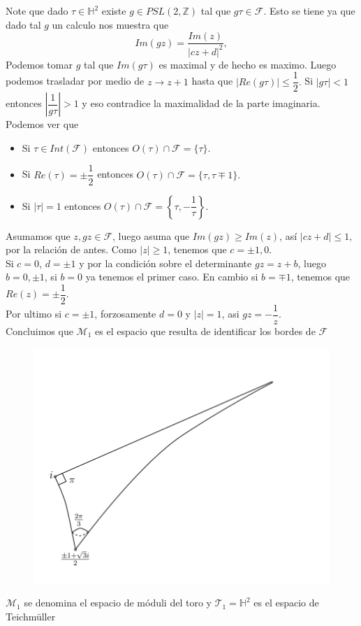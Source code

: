\documentclass[xcolor=dvipsnames,10pt]{beamer}
\newcommand\Z{\ensuremath{\mathbb{Z}}}
\newcommand\Hs{\ensuremath{\mathbb{H}}}
\begin{document}
\begin{frame}
    Note que dado $\tau\in\Hs^2$ existe $g\in PSL(2,\Z)$ tal que $g\tau\in\mathcal{F}.$ Esto se tiene ya que dado tal $g$ un calculo nos muestra que
    $$Im(gz)=\frac{Im(z)}{|cz+d|^2},$$
    Podemos tomar $g$ tal que $Im(g\tau)$ es maximal y de hecho es maximo. Luego podemos trasladar por medio de $z\to z+1$ hasta que $|Re(g\tau)|\leq \dfrac{1}{2}.$ Si $|g\tau|<1$ entonces $\left|\dfrac{1}{g\tau}\right|>1$ y eso contradice la maximalidad de la parte imaginaria.\\
    Podemos ver que
    \begin{itemize}
        \item Si $\tau\in Int(\mathcal{F})$ entonces $O(\tau)\cap\mathcal{F}=\{\tau\}.$ 
        \item Si $Re(\tau)=\pm\dfrac{1}{2}$ entonces $O(\tau)\cap\mathcal{F}=\{\tau,\tau\mp1\}.$
        \item Si $|\tau|=1$ entonces $O(\tau)\cap \mathcal{F}=\left\{\tau,-\dfrac{1}{\tau}\right\}.$
    \end{itemize}
    
\end{frame}
\begin{frame}
    Asumamos que $z,gz\in\mathcal{F}$, luego asuma que $Im(gz)\geq Im(z)$, así $|cz+d|\leq 1,$ por la relación de antes. Como $|z|\geq 1$, tenemos que $c=\pm1,0.$\\

    Si $c=0$, $d=\pm 1$ y por la condición sobre el determinante $gz=z+b$, luego $b=0,\pm 1$, si $b=0$ ya tenemos el primer caso. En cambio si $b=\mp 1$, tenemos que $Re(z)=\pm\dfrac{1}{2}.$\\

    Por ultimo si $c=\pm 1$, forzosamente $d=0$ y $|z|=1$, asi $gz=-\dfrac{1}{z}.$\\

    Concluimos que $\mathcal{M}_1$ es el espacio que resulta de identificar los bordes de $\mathcal{F}$
    \begin{figure}
            \centering
            \includegraphics[width=0.5\linewidth]{Imagenes/Empanada.png}
        \end{figure} 

    $\mathcal{M}_1$ se denomina el espacio de móduli del toro y $\mathcal{T}_1 = \Hs^2 $ es el espacio de Teichmüller
\end{frame}
\end{document}
